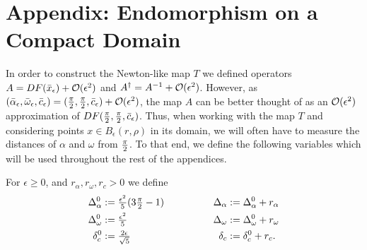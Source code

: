

\section{Appendix: Endomorphism on a Compact Domain}
\label{sec:CompactDomain}



In order to construct the Newton-like map $T$ we defined operators $ A =  DF(\bar{x}_\epsilon) + \mathcal{O}(\epsilon^2)$ and $A^{\dagger} = A^{-1} + \mathcal{O}(\epsilon^2)$. 
However, as $(\bar{\alpha}_\epsilon,\bar{\omega}_\epsilon,\bar{c}_\epsilon) = (\tfrac{\pi}{2},\tfrac{\pi}{2},\bar{c}_\epsilon) + \mathcal{O}(\epsilon^2)$,  the map $A$ can be better thought of as an $\mathcal{O}(\epsilon^2)$ approximation of $DF(\tfrac{\pi}{2},\tfrac{\pi}{2},\bar{c}_\epsilon)$. 
Thus, when working with the map $T$ and considering points $ x \in  B_\epsilon(r,\rho)$ in its domain, we will often have to measure the distances of $ \alpha$ and $ \omega $ from $ \tfrac{\pi}{2}$. 
To that end, we define the following variables which will be used throughout the rest of the appendices. 
\begin{definition}
	\label{def:DeltaDef}
For $ \epsilon \geq 0$, and $r_\alpha,r_\omega,r_c >0$ we define 
\begin{alignat*}{2}
	\Delta_\alpha^0 	&:= \tfrac{\epsilon^2}{5} ( 3 \tfrac{\pi}{2} -1) & \qquad\qquad
	\Delta_\alpha 	&:= \Delta_\alpha^0 + r_\alpha \\
	\Delta_\omega^0 &:=  \tfrac{\epsilon^2}{5} &
	\Delta_\omega &:=  \Delta_\omega^0 + r_{\omega} \\ 
	\delta_c^0 &:=  \tfrac{2 \epsilon}{\sqrt{5}} &
	\delta_c &:=  \delta_c^0 + r_c . 
\end{alignat*}
\end{definition}


